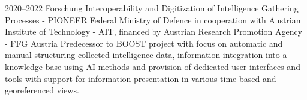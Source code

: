 \cventry
{2020--2022}
{Forschung}
{Interoperability and Digitization of Intelligence Gathering Processes - PIONEER}
{
  Federal Ministry of Defence
  in cooperation with Austrian Institute of Technology - AIT,
  financed by Austrian Research Promotion Agency - FFG
}
{Austria}
{
  Predecessor to BOOST project with focus on automatic and manual structuring
  collected intelligence data, information integration into a knowledge base
  using AI methods and provision of dedicated user interfaces and tools with
  support for information presentation in various time-based and georeferenced views.
}
